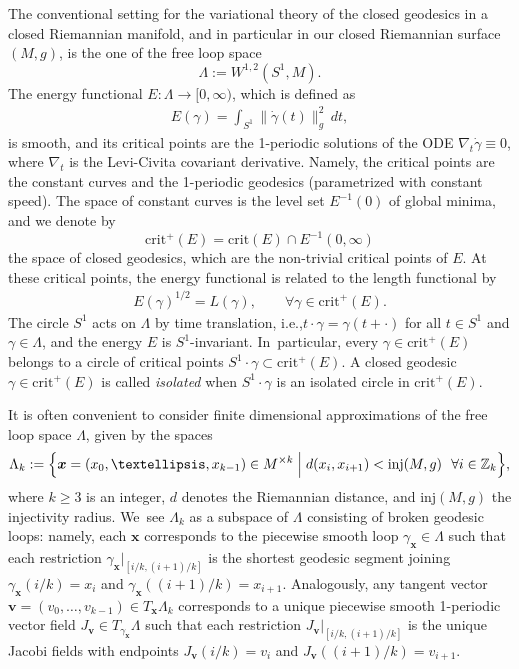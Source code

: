 \documentclass[11pt]{article}
\newcommand{\ie}{i.e.,\xspace}
\let\bm\boldsymbol
\newcommand{\Z}{\mathbb{Z}}
\newcommand{\xx}{\bm{x}}
\newcommand{\vv}{\bm{v}}
\newcommand{\crit}{\mathrm{crit}}
\newcommand{\inj}{\mathrm{inj}}
\theoremstyle{plain}
\theoremstyle{definition}
\begin{document}
The conventional setting for the variational theory of the closed geodesics in a closed Riemannian manifold, and in particular in our closed Riemannian surface $(M,g)$, is the one of the free loop space \[
\Lambda:=W^{1,2}(S^1,M).
\] The energy functional $E:\Lambda\to[0,\infty)$, which is defined as
\begin{align*}
E(\gamma)=\int_{S^1} \|\dot\gamma(t)\|_g^2\,dt,
\end{align*}
is smooth, and its critical points are the 1-periodic solutions of the ODE $\nabla_t\dot\gamma\equiv0$, where $\nabla_t$ is the Levi-Civita covariant derivative. Namely, the critical points are the constant curves and the 1-periodic geodesics (parametrized with constant speed).
The space of constant curves is the level set $E^{-1}(0)$ of global minima, and we denote by \[
\crit^+(E)=\crit(E)\cap E^{-1}(0,\infty)
\] the space of closed geodesics, which are the non-trivial critical points of $E$.
At these critical points, the energy functional is related to the length functional by
\begin{align*}
E(\gamma)^{1/2}=L(\gamma),\qquad\forall \gamma\in\crit^+(E).
\end{align*}
The circle $S^1$ acts on $\Lambda$ by time translation, \ie $t\cdot\gamma=\gamma(t+\cdot)$ for all $t\in S^1$ and $\gamma\in\Lambda$, and the energy $E$ is $S^1$-invariant. In~particular, every $\gamma\in\crit^+(E)$ belongs to a circle of critical points $S^1\cdot\gamma\subset\crit^+(E)$. A closed geodesic $\gamma\in\crit^+(E)$ is called \emph{isolated} when $S^1\cdot\gamma$ is an isolated circle in $\crit^+(E)$.

It is often convenient to consider finite dimensional approximations of the free loop space $\Lambda$, given by the spaces
\begin{align*}
\Lambda_k:=\Big\{ \xx=(x_0,\dots,x_{k-1})\in M^{\times k}\Bigm|d(x_i,x_{i+1})<\inj(M,g)\ \ \forall i\in\Z_k \Big\},
\end{align*}
where $k\geq 3$ is an integer, $d$ denotes the Riemannian distance, and $\inj(M,g)$ the injectivity radius. We~see $\Lambda_k$ as a subspace of $\Lambda$ consisting of broken geodesic loops: namely, each $\xx$ corresponds to the piecewise smooth loop $\gamma_{\xx}\in\Lambda$ such that each restriction $\gamma_{\xx}|_{[i/k,(i+1)/k]}$ is the shortest geodesic segment joining $\gamma_{\xx}(i/k)=x_i$ and $\gamma_{\xx}((i+1)/k)=x_{i+1}$. Analogously, any tangent vector $\vv=(v_0,\dots,v_{k-1})\in T_{\xx}\Lambda_k$ corresponds to a unique piecewise smooth 1-periodic vector field $J_{\vv}\in T_{\gamma_{\xx}}\Lambda$ such that each restriction $J_{\vv}|_{[i/k,(i+1)/k]}$ is the unique Jacobi fields with endpoints $J_{\vv}(i/k)=v_i$ and $J_{\vv}((i+1)/k)=v_{i+1}$.
\end{document}
